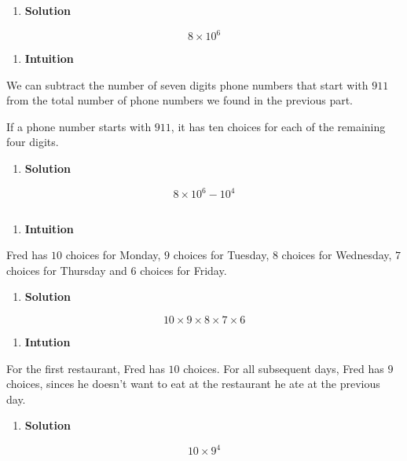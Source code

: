 \documentclass[]{book}
\providecommand{\tightlist}{%
  \setlength{\itemsep}{0pt}\setlength{\parskip}{0pt}}
\begin{document}
\begin{enumerate}
\def\labelenumi{(\alph{enumi})}
\tightlist
\item
  \textbf{Solution}
\end{enumerate}

\[ 8 \times 10^{6} \]

\begin{enumerate}
\def\labelenumi{(\alph{enumi})}
\setcounter{enumi}{1}
\tightlist
\item
  \textbf{Intuition}
\end{enumerate}

We can subtract the number of seven digits phone numbers that start with
\(911\) from the total number of phone numbers we found in the previous
part.

If a phone number starts with \(911\), it has ten choices for each of
the remaining four digits.

\begin{enumerate}
\def\labelenumi{(\alph{enumi})}
\setcounter{enumi}{1}
\tightlist
\item
  \textbf{Solution}
\end{enumerate}

\[ 8 \times 10^{6} - 10^{4} \]

\subsection{}\label{section-2}

\begin{enumerate}
\def\labelenumi{(\alph{enumi})}
\tightlist
\item
  \textbf{Intuition}
\end{enumerate}

Fred has \(10\) choices for Monday, \(9\) choices for Tuesday, \(8\)
choices for Wednesday, \(7\) choices for Thursday and \(6\) choices for
Friday.

\begin{enumerate}
\def\labelenumi{(\alph{enumi})}
\tightlist
\item
  \textbf{Solution}
\end{enumerate}

\[ 10 \times 9 \times 8 \times 7 \times 6 \]

\begin{enumerate}
\def\labelenumi{(\alph{enumi})}
\setcounter{enumi}{1}
\tightlist
\item
  \textbf{Intution}
\end{enumerate}

For the first restaurant, Fred has \(10\) choices. For all subsequent
days, Fred has \(9\) choices, sinces he doesn't want to eat at the
restaurant he ate at the previous day.

\begin{enumerate}
\def\labelenumi{(\alph{enumi})}
\setcounter{enumi}{1}
\tightlist
\item
  \textbf{Solution}
\end{enumerate}

\[ 10 \times 9^{4} \]


\end{document}
